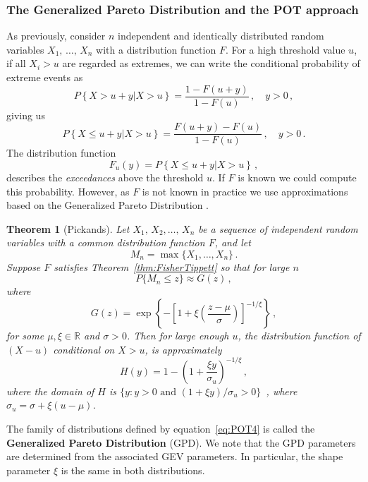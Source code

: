 \documentclass[letter,12pt]{article}
\newtheorem{theorem}{Theorem}
\begin{document}
\subsubsection{The Generalized Pareto Distribution and the POT approach} \label{sec:potapproach}
As previously, consider $n$ independent and identically distributed random variables $X_1, \, \ldots, \, X_n$ with a distribution function $F$.  For a high threshold value $u$, if all $X_i > u$ are regarded as extremes, we can write the conditional probability of extreme events as 
\begin{equation}\label{eq:POT1}
    P\left \{X > u + y | X > u \right \} = \frac{1 - F(u+y)}{1 - F(u)}\, , \quad y >0 \, , 
\end{equation}
giving us
\begin{equation}\label{eq:POT2}
    P\left \{X \leq u + y | X > u \right \} = \frac{ F(u+y) - F(u)}{1 - F(u)}\, , \quad y >0 \, . 
\end{equation}
The distribution function
\begin{equation}\label{eq:POT3}
    F_u(y) = P\left \{X \leq u + y | X > u \right \}\, , 
\end{equation}
describes the \textit{exceedances} above the threshold $u$. If $F$ is known we could compute this probability. However, as $F$ is not known in practice we use approximations based on the Generalized Pareto Distribution \citep{Pickands1975}. 
\begin{theorem}[Pickands] Let $X_1, \, X_2, \ldots, \, X_n$  be a sequence of independent random variables with a common distribution function $F$, and let
$$ M_n = \max \{X_1, \ldots, X_n \} \, .
$$
Suppose $F$ satisfies Theorem~\ref{thm:FisherTippett} so that for large $n$
$$ P\{ M_n \leq z \} \approx G(z)\, , 
$$
where 
$$  G(z) = \exp\left\{ -\left[ 1 + \xi\left(\frac{z - \mu}{\sigma} \right)\right]^{-1/\xi} \right\}\, , 
$$
for some $\mu, \xi \in \mathbb{R}$ and $\sigma >0$. Then for large enough $u$, the distribution function of $(X-u)$ conditional on $X > u$, is approximately
\begin{equation}\label{eq:POT4}
    H(y) = 1 - \left( 1 + \frac{\xi y}{\sigma_u} \right)^{-1/\xi}\, , 
\end{equation}
where the domain of $H$ is $\{y: y >0\, \,    \text{and} \, \,  (1 + \xi y)/\sigma_u >0  \}$\, , where $\sigma_u = \sigma + \xi(u- \mu)$. 
\end{theorem}
The family of distributions defined by equation~\eqref{eq:POT4} is called the \textbf{Generalized Pareto Distribution} (GPD). We note that the GPD parameters are determined from the associated GEV parameters. In particular, the shape parameter $\xi$ is the same in both distributions. 
\end{document}
